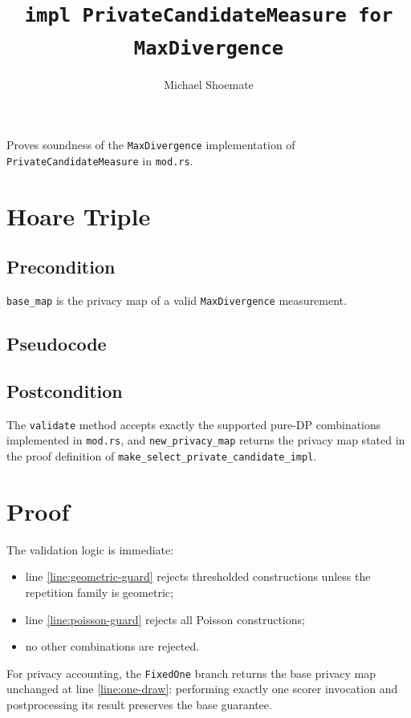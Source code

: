 \documentclass{article}
\title{\texttt{impl PrivateCandidateMeasure for MaxDivergence}}
\author{Michael Shoemate}
\date{}
\begin{document}
\maketitle

Proves soundness of the \texttt{MaxDivergence} implementation of
\texttt{PrivateCandidateMeasure} in \texttt{mod.rs}.

\section{Hoare Triple}
\subsection*{Precondition}
\texttt{base\_map} is the privacy map of a valid \texttt{MaxDivergence} measurement.

\subsection*{Pseudocode}


\subsection*{Postcondition}
\begin{theorem}
\label{postcondition}
The \texttt{validate} method accepts exactly the supported pure-DP combinations implemented in
\texttt{mod.rs}, and \texttt{new\_privacy\_map} returns the privacy map stated in the proof
definition of \texttt{make\_select\_private\_candidate\_impl}.
\end{theorem}

\section{Proof}
The validation logic is immediate:
\begin{itemize}
    \item line \ref{line:geometric-guard} rejects thresholded constructions unless the repetition
    family is geometric;
    \item line \ref{line:poisson-guard} rejects all Poisson constructions;
    \item no other combinations are rejected.
\end{itemize}

For privacy accounting, the \texttt{FixedOne} branch returns the base
privacy map unchanged at line \ref{line:one-draw}: performing exactly one
scorer invocation and postprocessing its result preserves the base guarantee.
\end{document}
